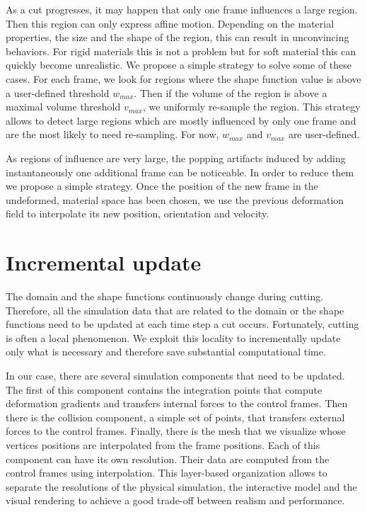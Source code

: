 As a cut progresses, it may happen that only one frame influences a large region. Then this region can only express affine motion. Depending on the material properties, the size and the shape of the region, this can result in unconvincing behaviors. For rigid materials this is not a problem but for soft material this can quickly become unrealistic. We propose a simple strategy to solve some of these cases. For each frame, we look for regions where the shape function value is above a user-defined threshold $w_{max}$. Then if the volume of the region is above a maximal volume threshold $v_{max}$, we uniformly re-sample the region. This strategy allows to detect large regions which are mostly influenced by only one frame and are the most likely to need re-sampling. For now, $w_{max}$ and $v_{max}$ are user-defined.

As regions of influence are very large, the popping artifacts induced by adding instantaneously one additional frame can be noticeable. In order to reduce them we propose a simple strategy. Once the position of the new frame in the undeformed, material space has been chosen, we use the previous deformation field to interpolate its new position, orientation and velocity.

\section{Incremental update} \label{sec:incremental}

The domain and the shape functions continuously change during cutting. Therefore, all the simulation data that are related to the domain or the shape functions need to be updated at each time step a cut occurs. Fortunately, cutting is often a local phenomenon. We exploit this locality to incrementally update only what is necessary and therefore save substantial computational time.

In our case, there are several simulation components that need to be updated. The first of this component contains the integration points that compute deformation gradients and transfers internal forces to the control frames. Then there is the collision component, a simple set of points, that transfers external forces to the control frames. Finally, there is the mesh that we visualize whose vertices positions are interpolated from the frame positions. Each of this component can have its own resolution. Their data are computed from the control frames using interpolation. This layer-based organization allows to separate the resolutions of the physical simulation, the interactive model and the visual rendering to achieve a good trade-off between realism and performance.

